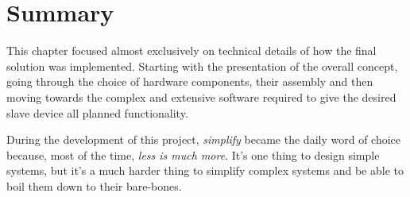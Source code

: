 \section{Summary} \label{sec:impl-summary}
This chapter focused almost exclusively on technical details of how the final solution was implemented.
Starting with the presentation of the overall concept, going through the choice of hardware components, their assembly and then moving towards the complex and extensive software required to give the desired slave device all planned functionality.

During the development of this project, \emph{simplify} became the daily word of choice because, most of the time, \emph{less is much more}.
It's one thing to design simple systems, but it's a much harder thing to simplify complex systems and be able to boil them down to their bare-bones.
